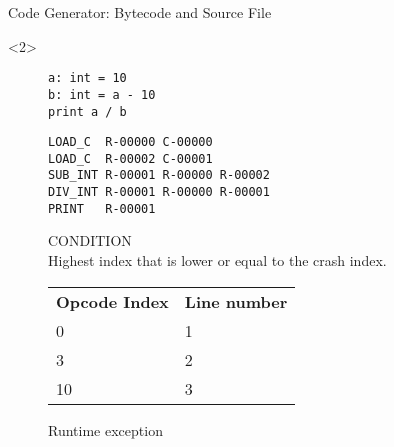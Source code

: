 \begin{frame}[fragile]{Code Generator: Bytecode and Source File}
    \begin{onlyenv}<2>
        \begin{figure}[H]
	        \centering
            \begin{subtable}{0.3\textwidth}
                \begin{verbatim}
a: int = 10
b: int = a - 10
print a / b
                \end{verbatim}
		    \caption{Input program}
	        \end{subtable}
	        \begin{subtable}{0.6\textwidth}
                \begin{verbatim}
LOAD_C  R-00000 C-00000
LOAD_C  R-00002 C-00001
SUB_INT R-00001 R-00000 R-00002
DIV_INT R-00001 R-00000 R-00001
PRINT   R-00001
                \end{verbatim}
            \caption{Bytecode generated}
	        \end{subtable}
            \begin{subtable}{0.3\textwidth}
                {\footnotesize \textsc{CONDITION}}\\
                Highest index that is lower or equal to the crash index.
	        \end{subtable}
            \begin{subtable}{0.6\textwidth}
                \centering
                \begin{tabular}{ l l }
                    \textbf{Opcode Index} & \textbf{Line number} \\
                    0 & 1 \\
                    3 & 2 \\
                    10 & 3 \\
                \end{tabular}
            \caption{Registered line changes}
	        \end{subtable}
        \caption{Runtime exception}
        \end{figure}
    \end{onlyenv}
\end{frame}
